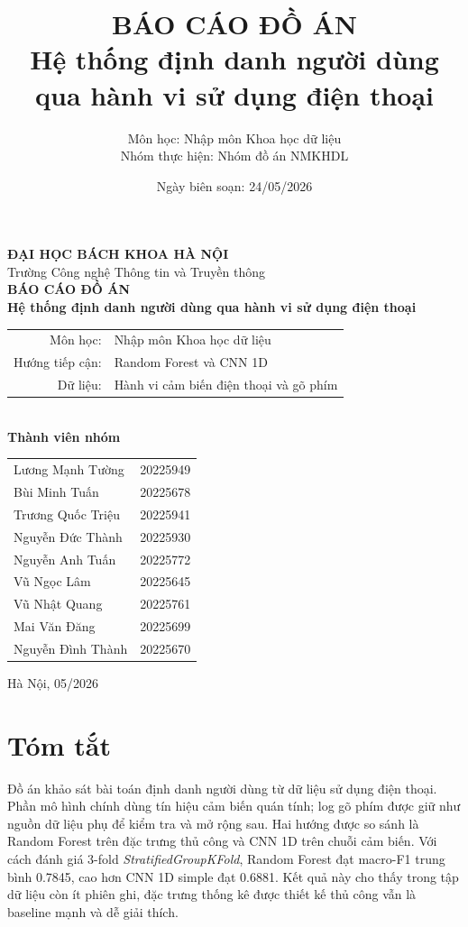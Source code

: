 \documentclass[12pt,a4paper]{article}
\title{\textbf{BÁO CÁO ĐỒ ÁN}\\[0.4cm]
\Large Hệ thống định danh người dùng qua hành vi sử dụng điện thoại}
\author{
Môn học: Nhập môn Khoa học dữ liệu\\
Nhóm thực hiện: Nhóm đồ án NMKHDL
}
\date{Ngày biên soạn: 24/05/2026}
\begin{document}
\hypersetup{pageanchor=false}
\begin{titlepage}
    \centering
    {\Large \textbf{ĐẠI HỌC BÁCH KHOA HÀ NỘI}}\\
    {\large Trường Công nghệ Thông tin và Truyền thông}\\[2.0cm]

    {\LARGE \textbf{BÁO CÁO ĐỒ ÁN}}\\[0.6cm]
    {\Large \textbf{Hệ thống định danh người dùng qua hành vi sử dụng điện thoại}}\\[1.2cm]

    \begin{tabular}{rl}
        Môn học: & Nhập môn Khoa học dữ liệu \\
        Hướng tiếp cận: & Random Forest và CNN 1D \\
        Dữ liệu: & Hành vi cảm biến điện thoại và gõ phím \\
    \end{tabular}\\[1.6cm]

    \textbf{Thành viên nhóm}\\[0.3cm]
    \begin{tabular}{ll}
        Lương Mạnh Tường & 20225949 \\
        Bùi Minh Tuấn & 20225678 \\
        Trương Quốc Triệu & 20225941 \\
        Nguyễn Đức Thành & 20225930 \\
        Nguyễn Anh Tuấn & 20225772 \\
        Vũ Ngọc Lâm & 20225645 \\
        Vũ Nhật Quang & 20225761 \\
        Mai Văn Đăng & 20225699 \\
        Nguyễn Đình Thành & 20225670 \\
    \end{tabular}

    \vfill
    Hà Nội, 05/2026
\end{titlepage}

\hypersetup{pageanchor=true}
\tableofcontents
\newpage
{}

\section*{Tóm tắt}

Đồ án khảo sát bài toán định danh người dùng từ dữ liệu sử dụng điện thoại. Phần mô hình chính dùng tín hiệu cảm biến quán tính; log gõ phím được giữ như nguồn dữ liệu phụ để kiểm tra và mở rộng sau. Hai hướng được so sánh là Random Forest trên đặc trưng thủ công và CNN 1D trên chuỗi cảm biến. Với cách đánh giá 3-fold \textit{StratifiedGroupKFold}, Random Forest đạt macro-F1 trung bình 0.7845, cao hơn CNN 1D simple đạt 0.6881. Kết quả này cho thấy trong tập dữ liệu còn ít phiên ghi, đặc trưng thống kê được thiết kế thủ công vẫn là baseline mạnh và dễ giải thích.
\end{document}
